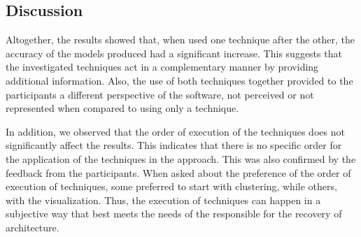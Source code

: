 {%

\subsection{Discussion}



Altogether, the results showed that, when used one technique after the other, the accuracy of the models produced had a significant increase. 
This suggests that the investigated techniques act in a complementary manner by providing additional information. Also, the use of both techniques 
together provided to the participants a different perspective of the software, not perceived or not represented when compared to using only a technique. 


In addition, we observed that the order of execution of the techniques does not significantly affect the results. This indicates that there is no specific 
order for the application of the techniques in the approach. This was also confirmed by the feedback from the participants. When asked about the preference of the order 
of execution of techniques, some preferred to start with clustering, while others, with the visualization. Thus, the execution of techniques can happen in a subjective way that best meets the needs of the responsible for the recovery of architecture.

}
